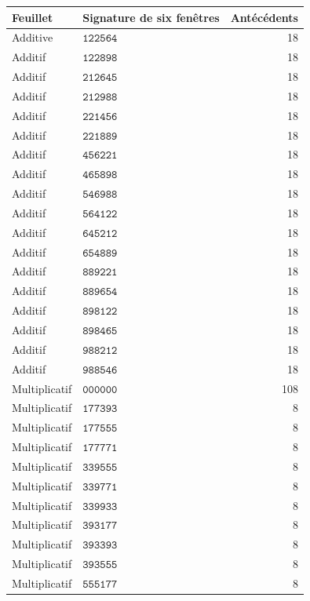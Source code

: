 \begin{longtable}{@{}llr@{}}
\toprule Feuillet&Signature de six fenêtres&Antécédents\\\midrule\endhead
Additive&\(\mathtt{122564}\)&18\\
Additif&\(\mathtt{122898}\)&18\\
Additif&\(\mathtt{212645}\)&18\\
Additif&\(\mathtt{212988}\)&18\\
Additif&\(\mathtt{221456}\)&18\\
Additif&\(\mathtt{221889}\)&18\\
Additif&\(\mathtt{456221}\)&18\\
Additif&\(\mathtt{465898}\)&18\\
Additif&\(\mathtt{546988}\)&18\\
Additif&\(\mathtt{564122}\)&18\\
Additif&\(\mathtt{645212}\)&18\\
Additif&\(\mathtt{654889}\)&18\\
Additif&\(\mathtt{889221}\)&18\\
Additif&\(\mathtt{889654}\)&18\\
Additif&\(\mathtt{898122}\)&18\\
Additif&\(\mathtt{898465}\)&18\\
Additif&\(\mathtt{988212}\)&18\\
Additif&\(\mathtt{988546}\)&18\\
Multiplicatif&\(\mathtt{000000}\)&108\\
Multiplicatif&\(\mathtt{177393}\)&8\\
Multiplicatif&\(\mathtt{177555}\)&8\\
Multiplicatif&\(\mathtt{177771}\)&8\\
Multiplicatif&\(\mathtt{339555}\)&8\\
Multiplicatif&\(\mathtt{339771}\)&8\\
Multiplicatif&\(\mathtt{339933}\)&8\\
Multiplicatif&\(\mathtt{393177}\)&8\\
Multiplicatif&\(\mathtt{393393}\)&8\\
Multiplicatif&\(\mathtt{393555}\)&8\\
Multiplicatif&\(\mathtt{555177}\)&8\\

\end{longtable}
